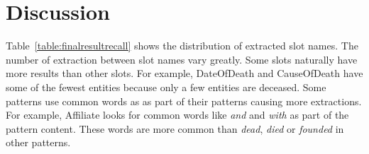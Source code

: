 \documentclass[letterpaper]{article}
\begin{document}
\section{Discussion}


Table~\ref{table:finalresultrecall} shows the distribution of extracted slot names.
The number of extraction between slot names vary greatly.
Some slots naturally have more results than other slots.
For example, DateOfDeath and CauseOfDeath have some of the fewest entities because only a few entities are deceased.
Some patterns use common words as as part of their patterns causing more extractions.
For example, Affiliate looks for common words like  \textit{and} and  \textit{with} as part of the pattern content.
These words are more common than \textit{dead}, \textit{died} or \textit{founded} in other patterns. 

\end{document}
